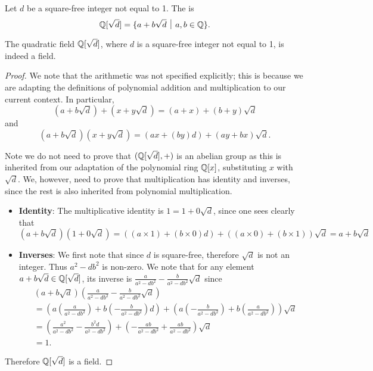 \begin{definition}
    Let $d$ be a square-free integer not equal to 1. The  is
    \[
        \Q[\sqrt{d}] = \{a + b\sqrt{d} \vert a,b\in\Q\}.
    \]
\end{definition}
\begin{proposition}\label{prop-quadratic-field-is-a-field}
    The quadratic field $\mathbb{Q}[\sqrt{d}]$, where $d$ is a square-free integer not equal to 1, is indeed a field.
\end{proposition}
\begin{proof}
    We note that the arithmetic was not specified explicitly; this is because we are adapting the definitions of polynomial addition and multiplication to our current context. In particular,
    \[
        (a+b\sqrt{d}) + (x + y\sqrt{d}) = (a+x) + (b+y)\sqrt{d}
    \]
    and
    \[
        (a+b\sqrt{d})(x+y\sqrt{d}) = (ax+(by)d) + (ay + bx)\sqrt{d}.
    \]

    Note we do not need to prove that $(\mathbb{Q}[\sqrt{d}], +)$ is an abelian group as this is inherited from our adaptation of the polynomial ring $\mathbb{Q}[x]$, substituting $x$ with $\sqrt{d}$. We, however, need to prove that multiplication has identity and inverses, since the rest is also inherited from polynomial multiplication.

    \begin{itemize}
        \item \textbf{Identity}: The multiplicative identity is $1 = 1 + 0\sqrt{d}$, since one sees clearly that
        \[
            (a+b\sqrt{d})(1+0\sqrt{d}) = ((a\times1) + (b\times0)d) + ((a\times0) + (b \times 1))\sqrt{d} = a + b\sqrt{d}
        \]

        \item \textbf{Inverses}: We first note that since $d$ is square-free, therefore $\sqrt{d}$ is not an integer. Thus $a^2 - db^2$ is non-zero. We note that for any element $a+b\sqrt{d} \in \mathbb{Q}[\sqrt{d}]$, its inverse is $\frac{a}{a^2-db^2} - \frac{b}{a^2-db^2}\sqrt{d}$ since
        \begin{align*}
            &(a+b\sqrt{d})\left(\frac{a}{a^2-db^2} - \frac{b}{a^2-db^2}\sqrt{d}\right)\\
            &= \left(a\left(\frac{a}{a^2-db^2}\right) + b\left(-\frac{b}{a^2-db^2}\right)d\right) + \left(a\left(-\frac{b}{a^2-db^2}\right) + b\left(\frac{a}{a^2-db^2}\right)\right)\sqrt{d}\\
            &=\left(\frac{a^2}{a^2-db^2} -\frac{b^2d}{a^2-db^2}\right) + \left(-\frac{ab}{a^2-db^2} + \frac{ab}{a^2-db^2}\right)\sqrt{d}\\
            &=1.
        \end{align*}
    \end{itemize}

    Therefore $\mathbb{Q}[\sqrt{d}]$ is a field.
\end{proof}

